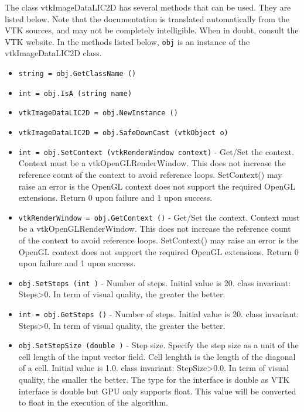The class vtkImageDataLIC2D has several methods that can be used.
  They are listed below.
Note that the documentation is translated automatically from the VTK sources,
and may not be completely intelligible.  When in doubt, consult the VTK website.
In the methods listed below, \verb|obj| is an instance of the vtkImageDataLIC2D class.
\begin{itemize}
\item  \verb|string = obj.GetClassName ()|

\item  \verb|int = obj.IsA (string name)|

\item  \verb|vtkImageDataLIC2D = obj.NewInstance ()|

\item  \verb|vtkImageDataLIC2D = obj.SafeDownCast (vtkObject o)|

\item  \verb|int = obj.SetContext (vtkRenderWindow context)| -  Get/Set the context. Context must be a vtkOpenGLRenderWindow. 
 This does not increase the reference count of the 
 context to avoid reference loops.
 SetContext() may raise an error is the OpenGL context does not support the
 required OpenGL extensions. Return 0 upon failure and 1 upon success.

\item  \verb|vtkRenderWindow = obj.GetContext ()| -  Get/Set the context. Context must be a vtkOpenGLRenderWindow. 
 This does not increase the reference count of the 
 context to avoid reference loops.
 SetContext() may raise an error is the OpenGL context does not support the
 required OpenGL extensions. Return 0 upon failure and 1 upon success.

\item  \verb|obj.SetSteps (int )| -  Number of steps. Initial value is 20.
 class invariant: Steps>0.
 In term of visual quality, the greater the better.

\item  \verb|int = obj.GetSteps ()| -  Number of steps. Initial value is 20.
 class invariant: Steps>0.
 In term of visual quality, the greater the better.

\item  \verb|obj.SetStepSize (double )| -  Step size.
 Specify the step size as a unit of the cell length of the input vector
 field. Cell lenghth is the length of the diagonal of a cell.
 Initial value is 1.0.
 class invariant: StepSize>0.0.
 In term of visual quality, the smaller the better.
 The type for the interface is double as VTK interface is double
 but GPU only supports float. This value will be converted to
 float in the execution of the algorithm.


\end{itemize}
